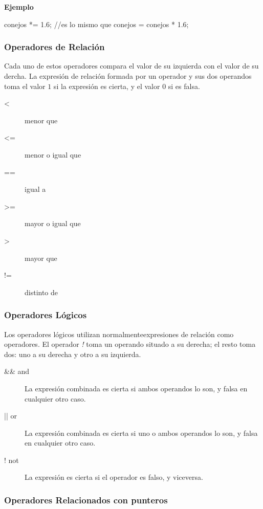 \textbf{Ejemplo}

conejos *= 1.6; //es lo mismo que conejos = conejos * 1.6;

\subsubsection{Operadores de Relación}

Cada uno de estos operadores compara el valor de su izquierda con el valor de su dercha. La expresión de relación formada por un operador y sus dos operandos toma el valor $1$ si la expresión es cierta, y el valor $0$ si es falsa.

\begin{description}
\item [<] menor que
\item [<=] menor o igual que 
\item [==] igual a
\item [>=] mayor o igual que
\item [>] mayor que 
\item [!=] distinto de
\end{description}

\subsubsection{Operadores Lógicos}

Los operadores lógicos utilizan normalmenteexpresiones de relación como operadores. El operador \textit{!} toma un operando situado a su derecha; el resto toma dos: uno a su derecha y otro a su izquierda.

\begin{description}
\item [\&\& and] La expresión combinada es cierta si ambos operandos lo son, y falsa en cualquier otro caso.
\item [|| or] La expresión combinada es cierta si uno o ambos operandos lo son, y falsa en cualquier otro caso.
\item [! not] La expresión es cierta si el operador es falso, y viceversa.
\end{description}

\subsubsection{Operadores Relacionados con punteros}

